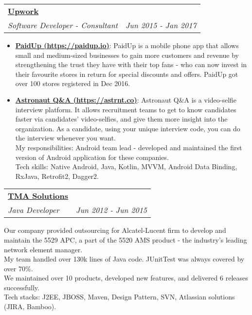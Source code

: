 \documentclass[letterpaper,11pt]{article}
\makeatletter
\newcommand{\resumeItem}[2]{
  \item\small{
    \textbf{#1}{: #2 \vspace{-2pt}}
  }
}
\newcommand{\resumeSubheading}[4]{
  \vspace{-1pt}\item
    \begin{tabular*}{0.97\textwidth}[t]{l@{\extracolsep{\fill}}r}
      \textbf{#1} & #2 \\
      \textit{\small#3} & \textit{\small #4} \\
    \end{tabular*}\vspace{-5pt}
}
\newcommand{\resumeItemListStart}{\begin{itemize}\vspace{3pt}}
\newcommand{\resumeItemListEnd}{\end{itemize}\vspace{-5pt}}
\makeatother
\begin{document}
    \resumeSubheading
      {\href{https://www.upwork.com}{Upwork}}{}
      {Software Developer - Consultant}{Jun 2015 - Jan 2017}
      \resumeItemListStart
      {I worked directly with the co-founders of some startups companies as a software developer and consultant to develop Android apps. We successfully built and launched several mobile products together.}
        \resumeItem{\href{http://paidup.io}{PaidUp (https://paidup.io)}}
          {PaidUp is a mobile phone app that allows small and medium-sized businesses to gain more customers and revenue by strengthening the trust they have with their top fans - who can now invest in their favourite stores in return for special discounts and offers. PaidUp got over 100 stores registered in Dec 2016.}
        \resumeItem{\href{https://astrnt.co}{Astronaut Q\&A (https://astrnt.co)}}
          {Astronaut Q\&A is a video-selfie interview platform. It allows recruitment teams to get to know candidates faster via candidates’ video-selfies, and give them more insight into the organization. As a candidate, using your unique interview code, you can do the interview whenever you want. \\
          My responsibilities:  Android team lead - developed and maintained the first version of Android application for these companies.\\
          Tech skills: Native Android, Java, Kotlin, MVVM, Android Data Binding, RxJava, Retrofit2, Dagger2.}
      \resumeItemListEnd

    \resumeSubheading
      {\href{https://www.tmasolutions.com}{TMA Solutions}}{}
      {Java Developer}{Jun 2012 - Jun 2015}
      \resumeItemListStart
          {Our company provided outsourcing for Alcatel-Lucent firm to develop and maintain the 5529 APC, a part of the 5520 AMS product - the industry’s leading network element manager.\\
          My team handled over 130k lines of Java code. JUnitTest was always covered by over 70\%. \\
          We maintained over 10 products, developed new features, and delivered 6 releases successfully. \\
          Tech stacks: J2EE, JBOSS, Maven, Design Pattern, SVN, Atlassian solutions (JIRA, Bamboo).}
      \resumeItemListEnd
\end{document}
